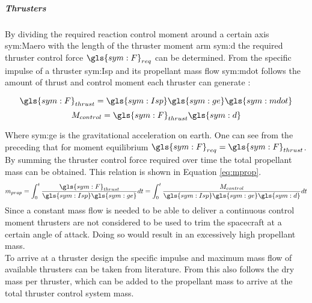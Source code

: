 \subparagraph{Thrusters}
\label{subpar:thrusters}
By dividing the required reaction control moment around a certain axis \gls{sym:Maero} with the length of the thruster moment arm \gls{sym:d} the required thruster control force $\gls{sym:F}_{req}$ can be determined. From the specific impulse of a thruster \gls{sym:Isp} and its propellant mass flow \gls{sym:mdot} follows the amount of thrust and control moment each thruster can generate \cite{Allen2012}:
\begin{multicols}{2}
\begin{equation}
\gls{sym:F}_{thrust}=\gls{sym:Isp}\gls{sym:ge}\gls{sym:mdot}
\label{eq:Fthrust}
\end{equation}
\begin{equation}
M_{control}=\gls{sym:F}_{thrust}\gls{sym:d}
\end{equation}
\end{multicols}
Where \gls{sym:ge} is the gravitational acceleration on earth. One can see from the preceding that for moment equilibrium $\gls{sym:F}_{req}=\gls{sym:F}_{thrust}$. By summing the thruster control force required over time the total propellant mass can be obtained. This relation is shown in Equation \ref{eq:mprop}.
\begin{equation}
m_{prop}=\int_{0}^{t} \frac{\gls{sym:F}_{thrust}}{\gls{sym:Isp}\gls{sym:ge}} dt = \int_{0}^{t} \frac{M_{control}}{\gls{sym:Isp}\gls{sym:ge}\gls{sym:d}} dt
\label{eq:mprop}
\end{equation}
Since a constant mass flow is needed to be able to deliver a continuous control moment thrusters are not considered to be used to trim the spacecraft at a certain angle of attack. Doing so would result in an excessively high propellant mass. \\
To arrive at a thruster design the specific impulse and maximum mass flow of available thrusters can be taken from literature. From this also follows the dry mass per thruster, which can be added to the propellant mass to arrive at the total thruster control system mass.

